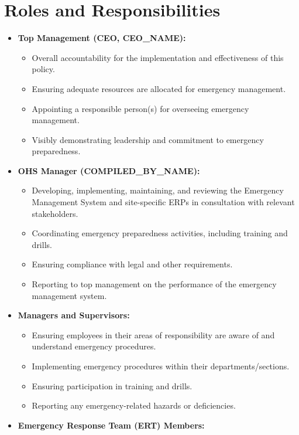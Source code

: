 \documentclass[11pt]{article}
\newcommand{\compilerName}{{{COMPILED_BY_NAME}}}
\begin{document}
\section{Roles and Responsibilities}
\begin{itemize}
    \item \textbf{Top Management (CEO, {{CEO_NAME}}):}
    \begin{itemize}
        \item Overall accountability for the implementation and effectiveness of this policy.
        \item Ensuring adequate resources are allocated for emergency management.
        \item Appointing a responsible person(s) for overseeing emergency management.
        \item Visibly demonstrating leadership and commitment to emergency preparedness.
    \end{itemize}
    \item \textbf{OHS Manager (\compilerName):}
    \begin{itemize}
        \item Developing, implementing, maintaining, and reviewing the Emergency Management System and site-specific ERPs in consultation with relevant stakeholders.
        \item Coordinating emergency preparedness activities, including training and drills.
        \item Ensuring compliance with legal and other requirements.
        \item Reporting to top management on the performance of the emergency management system.
    \end{itemize}
    \item \textbf{Managers and Supervisors:}
    \begin{itemize}
        \item Ensuring employees in their areas of responsibility are aware of and understand emergency procedures.
        \item Implementing emergency procedures within their departments/sections.
        \item Ensuring participation in training and drills.
        \item Reporting any emergency-related hazards or deficiencies.
    \end{itemize}
    \item \textbf{Emergency Response Team (ERT) Members:}
    \begin{itemize}

\end{itemize}
\end{itemize}
\end{document}

